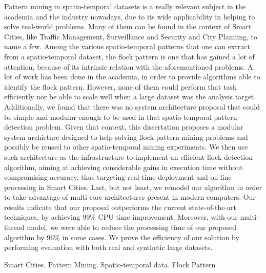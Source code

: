 Pattern mining in spatio-temporal datasets is a really relevant subject in the academia and the industry nowadays, due
to its wide applicability in helping to solve real-world problems. Many of them can be found in the context of Smart
Cities, like Traffic Management, Surveillance and Security and City Planning, to name a few. Among the various
spatio-temporal patterns that one can extract from a spatio-temporal dataset, the flock pattern is one that has gained a
lot of attention, because of its intrinsic relation with the aforementioned problems. A lot of work has been done in the
academia, in order to provide algorithms able to identify the flock pattern. However, none of them could perform that
task efficiently nor be able to scale well when a large dataset was the analysis target. Additionally, we found that
there was no system architecture proposal that could be simple and modular enough to be used in that spatio-temporal
pattern detection problem. Given that context, this dissertation proposes a modular system archicture designed to help
solving flock pattern mining problems and possibly be reused to other spatio-temporal mining experiments. We then use
such architecture as the infrastructure to implement an efficient flock detection algorithm, aiming at achieving
considerable gains in execution time without compromising accuracy, thus targeting real-time deployment and on-line
processing in Smart Cities. Last, but not least, we remodel our algorithm in order to take advantage of multi-core
architectures present in modern computers. Our results indicate that our proposal outperforms the current
state-of-the-art techniques, by achieving 99\% CPU time improvement. Moreover, with our multi-thread model, we were able
to reduce the processing time of our proposed algorithm by 96\% in some cases. We prove the efficiency of our solution
by performing evaluation with both real and synthetic large datasets.

\begin{keywords}
Smart Cities. Pattern Mining. Spatio-temporal data. Flock Pattern
\end{keywords}
